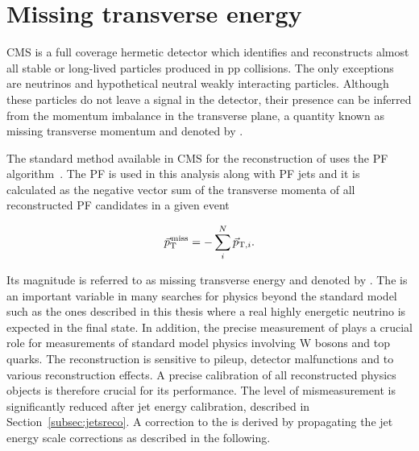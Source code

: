 \section{Missing transverse energy}\label{sec:met}

CMS is a full coverage hermetic detector which identifies and reconstructs almost all stable or long-lived particles produced in pp collisions. 
The only exceptions are neutrinos and hypothetical neutral weakly interacting particles.
Although these particles do not leave a signal in the detector, their presence can be inferred from the momentum imbalance in the transverse plane,
a quantity known as missing transverse momentum and denoted by \ptvecmiss.

The standard method available in CMS for the reconstruction of \ptvecmiss uses the PF algorithm~\cite{1748-0221-6-09-P09001}.
The PF \ptvecmiss is used in this analysis along with PF jets and it is calculated as the negative vector sum of the transverse momenta of all reconstructed PF candidates in a given event

\begin{equation}
{\vec p}_{\mathrm{T}}^{\kern1pt\text{miss}} = -\sum_{i}^{N}{\vec p}_{\mathrm{T},i}.
\end{equation}

Its magnitude is referred to as missing transverse energy and denoted by \ETmiss.
The \ETmiss is an important variable in many searches for physics beyond the standard model such as the ones described in this thesis where a real highly energetic neutrino is expected in the final state.
In addition, the precise measurement of \ETmiss plays a crucial role for measurements of standard model physics involving W bosons and top quarks.
The \ptvecmiss reconstruction is sensitive to pileup, detector malfunctions and to various reconstruction effects. A precise calibration of all reconstructed physics objects is therefore crucial for its performance.
The level of mismeasurement is significantly reduced after jet energy calibration, described in Section~\ref{subsec:jetsreco}.
A correction to the \ptvecmiss is derived by propagating the jet energy scale corrections as described in the following.

